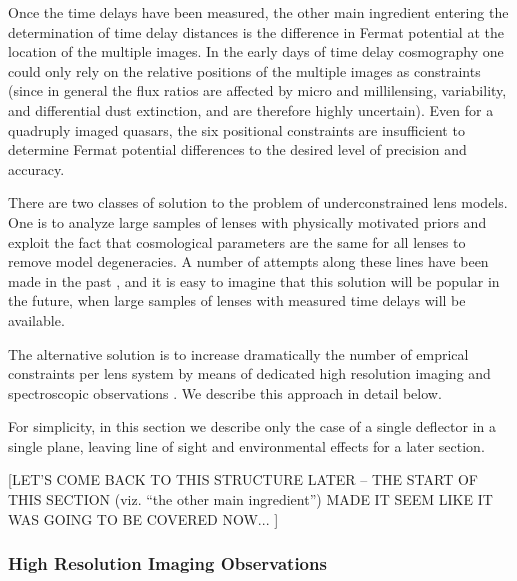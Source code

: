 Once the time delays have been measured, the other main ingredient
entering the determination of time delay distances is the difference
in Fermat potential at the location of the multiple images. In the
early days of time delay cosmography one could only rely on the
relative positions of the multiple images as constraints (since in
general the flux ratios are affected by micro and millilensing,
variability, and differential dust extinction, and are therefore
highly uncertain). Even for a quadruply imaged quasars, the six
positional constraints are insufficient to determine Fermat potential
differences to the desired level of precision and accuracy.

There are two classes of solution to the problem of underconstrained
lens models. One is to analyze large samples of lenses with physically
motivated priors and exploit the fact that cosmological parameters are
the same for all lenses to remove model degeneracies. A number of
attempts along these lines have been made in the past \citep{Ogu07},
and it is easy to imagine that this solution will be popular in the
future, when large samples of lenses with measured time delays will be
available.

The alternative solution is to increase dramatically the number of
emprical constraints per lens system by means of dedicated high
resolution imaging and spectroscopic observations
\citep{Suy++10,Suy++13,Suy++14}. We describe this approach in detail
below.

For simplicity, in this section we describe only the case of a single
deflector in a single plane, leaving line of sight and environmental
effects for a later section.

[LET'S COME BACK TO THIS STRUCTURE LATER -- THE START OF THIS SECTION
(viz. ``the other main ingredient'') MADE IT SEEM LIKE IT WAS GOING TO
BE COVERED NOW... ]


\subsubsection{High Resolution Imaging Observations}

